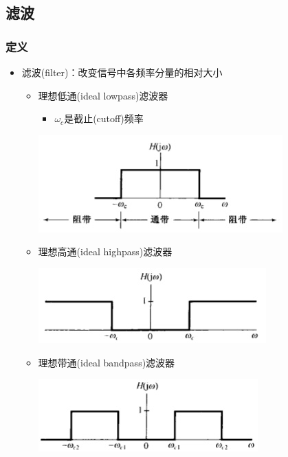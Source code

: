 \documentclass[CJKutf8,xcolor=pdftex,dvipsnames,table]{beamer}
\begin{document}
\begin{CJK*}{UTF8}{song}
  \section{滤波}
  
  \begin{frame}
    \frametitle{定义}
    \begin{itemize}
    \item 滤波(filter)：改变信号中各频率分量的相对大小
    	\begin{itemize}
    	\item 理想低通(ideal lowpass)滤波器
			\begin{itemize}
			\item $\omega_c$是截止(cutoff)频率
			\end{itemize} 
    
    		\begin{center}
      		\includegraphics[scale=.4]{ss-c-f3-26}
    		\end{center}
    
    	\item 理想高通(ideal highpass)滤波器
     		\begin{center}
      		\includegraphics[scale=.4]{ss-c-f3-27a}
    		\end{center}   
    
    	\item 理想带通(ideal bandpass)滤波器
     		\begin{center}
      		\includegraphics[scale=.4]{ss-c-f3-27b}
    		\end{center}   
	

\end{itemize}
\end{itemize}
\end{frame}
\end{CJK*}
\end{document}
